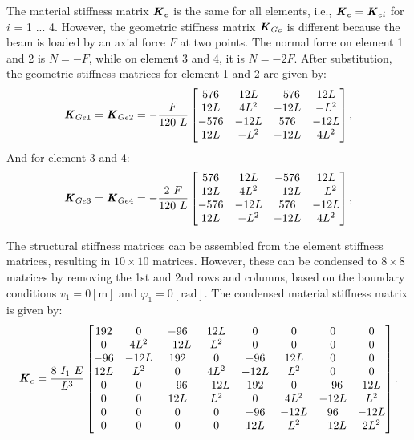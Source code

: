 \documentclass[12pt]{article}
\begin{document}
The material stiffness matrix $\textbf{\textit{K}}_e$ is the same for all elements, i.e., $\textbf{\textit{K}}_e = \textbf{\textit{K}}_{ei}$ for $i$ = 1 ... 4. However, the geometric stiffness matrix $\textbf{\textit{K}}_{Ge}$ is different because the beam is loaded by an axial force $F$ at two points. The normal force on element 1 and 2 is $N = -F$, while on element 3 and 4, it is $N = -2F$. After substitution, the geometric stiffness matrices for element 1 and 2 are given by:
\begin{equation}
\textbf{\textit{K}}_{Ge1} = \textbf{\textit{K}}_{Ge2} = -\dfrac{F}{120~L}\displaystyle \left[\begin{matrix}576 & 12 L & -576 & 12 L\\12 L & 4 L^{2} & - 12 L & - L^{2}\\-576 & - 12 L & 576 & - 12 L\\12 L & - L^{2} & - 12 L & 4 L^{2}\end{matrix}\right],
\end{equation}
And for element 3 and 4:
\begin{equation}
\textbf{\textit{K}}_{Ge3} = \textbf{\textit{K}}_{Ge4} = -\dfrac{2 ~ F}{120~L}\displaystyle \left[\begin{matrix}576 & 12 L & -576 & 12 L\\12 L & 4 L^{2} & - 12 L & - L^{2}\\-576 & - 12 L & 576 & - 12 L\\12 L & - L^{2} & - 12 L & 4 L^{2}\end{matrix}\right],
\end{equation}

\noindent The structural stiffness matrices can be assembled from the element stiffness matrices, resulting in $10 \times 10$ matrices. However, these can be condensed to $8 \times 8$ matrices by removing the 1st and 2nd rows and columns, based on the boundary conditions $v_1 = 0 \left[ \text{m} \right]$ and $\varphi_1 = 0 \left[ \text{rad} \right]$. The condensed material stiffness matrix is given by:
\begin{equation}
\textbf{\textit{K}}_{c} =  \dfrac{8~ I_1~E}{L^3} \left[\begin{matrix}192 & 0 & -96 & 12 L & 0 & 0 & 0 & 0\\0 & 4 L^{2} & - 12 L & L^{2} & 0 & 0 & 0 & 0\\-96 & - 12 L & 192 & 0 & -96 & 12 L & 0 & 0\\12 L & L^{2} & 0 & 4 L^{2} & - 12 L & L^{2} & 0 & 0\\0 & 0 & -96 & - 12 L & 192 & 0 & -96 & 12 L\\0 & 0 & 12 L & L^{2} & 0 & 4 L^{2} & - 12 L & L^{2}\\0 & 0 & 0 & 0 & -96 & - 12 L & 96 & - 12 L\\0 & 0 & 0 & 0 & 12 L & L^{2} & - 12 L & 2 L^{2}\end{matrix}\right].
\end{equation}
\end{document}
